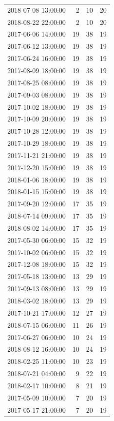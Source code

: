 \begin{tabular}{lrrr}
2018-07-08 13:00:00 & 2 & 10 & 20 \\
2018-08-22 22:00:00 & 2 & 10 & 20 \\
2017-06-06 14:00:00 & 19 & 38 & 19 \\
2017-06-12 13:00:00 & 19 & 38 & 19 \\
2017-06-24 16:00:00 & 19 & 38 & 19 \\
2017-08-09 18:00:00 & 19 & 38 & 19 \\
2017-08-25 08:00:00 & 19 & 38 & 19 \\
2017-09-03 08:00:00 & 19 & 38 & 19 \\
2017-10-02 18:00:00 & 19 & 38 & 19 \\
2017-10-09 20:00:00 & 19 & 38 & 19 \\
2017-10-28 12:00:00 & 19 & 38 & 19 \\
2017-10-29 18:00:00 & 19 & 38 & 19 \\
2017-11-21 21:00:00 & 19 & 38 & 19 \\
2017-12-20 15:00:00 & 19 & 38 & 19 \\
2018-01-06 18:00:00 & 19 & 38 & 19 \\
2018-01-15 15:00:00 & 19 & 38 & 19 \\
2017-09-20 12:00:00 & 17 & 35 & 19 \\
2018-07-14 09:00:00 & 17 & 35 & 19 \\
2018-08-02 14:00:00 & 17 & 35 & 19 \\
2017-05-30 06:00:00 & 15 & 32 & 19 \\
2017-10-02 06:00:00 & 15 & 32 & 19 \\
2017-12-08 18:00:00 & 15 & 32 & 19 \\
2017-05-18 13:00:00 & 13 & 29 & 19 \\
2017-09-13 08:00:00 & 13 & 29 & 19 \\
2018-03-02 18:00:00 & 13 & 29 & 19 \\
2017-10-21 17:00:00 & 12 & 27 & 19 \\
2018-07-15 06:00:00 & 11 & 26 & 19 \\
2017-06-27 06:00:00 & 10 & 24 & 19 \\
2018-08-12 16:00:00 & 10 & 24 & 19 \\
2018-02-25 11:00:00 & 10 & 23 & 19 \\
2018-07-21 04:00:00 & 9 & 22 & 19 \\
2018-02-17 10:00:00 & 8 & 21 & 19 \\
2017-05-09 10:00:00 & 7 & 20 & 19 \\
2017-05-17 21:00:00 & 7 & 20 & 19 \\

\end{tabular}
